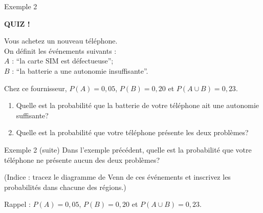 \documentclass{BeamerTemplate}
\newcommand{\cibleReponse}{}
\newcommand{\lienreponse}[1]{\gdef\cibleReponse{#1}}
\begin{document}
\begin{frame}[t,label=ex2]{Exemple 2}

\centerline{\LARGE\bfseries\alert{QUIZ !}}
\begin{minipage}{8cm}{
\small
Vous achetez un nouveau téléphone.\\
On définit les événements suivants :\\
$A$ : \enquote{la carte SIM est défectueuse};\\
$B$ : \enquote{la batterie a une autonomie insuffisante}.\\
}
\end{minipage}

\vspace{.3cm}

Chez ce fournisseur, $P(A)=0{,}05$, $P(B)=0{,}20$ et $P(A \cup B)=0{,}23$.

\begin{enumerate}[{a)}]\itemsep1cm
  \item Quelle est la probabilité que la batterie de votre téléphone ait une autonomie suffisante?
  \item Quelle est la probabilité que votre téléphone présente les deux problèmes?
\end{enumerate}
\lienreponse{rep-quiz}
\end{frame}



\begin{frame}[t,label=ex2s]{Exemple 2 (suite)}
Dans l'exemple précédent, quelle est la probabilité que votre téléphone ne présente aucun des deux problèmes?

 \bigskip

 (Indice : tracez le diagramme de Venn de ces événements et inscrivez les probabilités dans chacune des régions.)

 \bigskip
Rappel : $P(A)=0{,}05$, $P(B)=0{,}20$ et $P(A \cup B)=0{,}23$.
\vspace{3cm}

\lienreponse{rep-ex1}
\end{frame}
\end{document}
